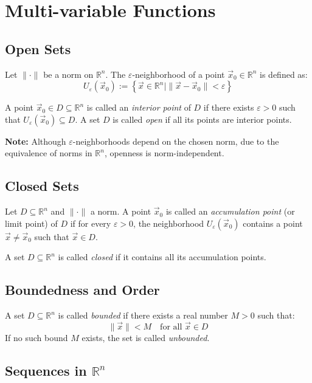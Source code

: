 \section{Multi-variable Functions}

\subsection{Open Sets}

Let \( \| \cdot \| \) be a norm on \( \mathbb{R}^n \). The \( \varepsilon \)-neighborhood of a point \( \vec{x}_0 \in \mathbb{R}^n \) is defined as:
\[
U_\varepsilon(\vec{x}_0) := \left\{ \vec{x} \in \mathbb{R}^n \mid \| \vec{x} - \vec{x}_0 \| < \varepsilon \right\}
\]

A point \( \vec{x}_0 \in D \subseteq \mathbb{R}^n \) is called an \emph{interior point} of \( D \) if there exists \( \varepsilon > 0 \) such that \( U_\varepsilon(\vec{x}_0) \subseteq D \).  
A set \( D \) is called \emph{open} if all its points are interior points.

\textbf{Note:} Although \( \varepsilon \)-neighborhoods depend on the chosen norm, due to the equivalence of norms in \( \mathbb{R}^n \), openness is norm-independent.


\subsection{Closed Sets}

Let \( D \subseteq \mathbb{R}^n \) and \( \| \cdot \| \) a norm. A point \( \vec{x}_0 \) is called an \emph{accumulation point} (or limit point) of \( D \) if for every \( \varepsilon > 0 \), the neighborhood \( U_\varepsilon(\vec{x}_0) \) contains a point \( \vec{x} \ne \vec{x}_0 \) such that \( \vec{x} \in D \).

A set \( D \subseteq \mathbb{R}^n \) is called \emph{closed} if it contains all its accumulation points.

\subsection{Boundedness and Order}

A set \( D \subseteq \mathbb{R}^n \) is called \emph{bounded} if there exists a real number \( M > 0 \) such that:
\[
\|\vec{x}\| < M \quad \text{for all } \vec{x} \in D
\]
If no such bound \( M \) exists, the set is called \emph{unbounded}.


\subsection{Sequences in \( \mathbb{R}^n \)}

